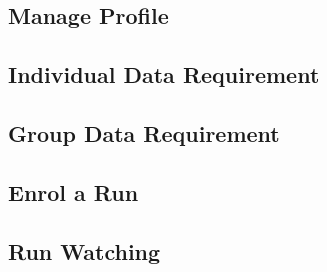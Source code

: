 \subsection{Manage Profile}

\clearpage

\subsection{Individual Data Requirement}

\clearpage

\subsection{Group Data Requirement}

\clearpage

\subsection{Enrol a Run}

\clearpage

\subsection{Run Watching}

\clearpage
